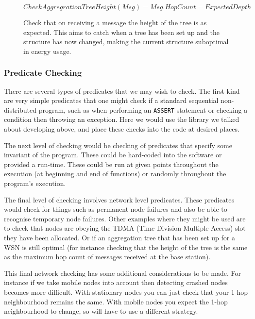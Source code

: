 \documentclass[a4paper]{article}
\begin{document}
\begin{figure}[H]
\begin{center}
    \begin{displaymath}
	CheckAggregrationTreeHeight(Msg) = Msg.HopCount = ExpectedDepth
	\end{displaymath}
	\caption{Check that on receiving a message the height of the tree is as
expected. This aims to catch when a tree has been set up and the structure has
now changed, making the current structure suboptimal in energy usage.}
\end{center}
\end{figure}

\subsubsection{Predicate Checking}

There are several types of predicates that we may wish to check. The first kind
are very simple predicates that one might check if a standard sequential
non-distributed program, such as when performing an \verb|ASSERT| statement or
checking a condition then throwing an exception. Here we would use the library
we talked about developing above, and place these checks into the code at
desired places.

The next level of checking would be checking of predicates that specify some
invariant of the program. These could be hard-coded into the software or
provided a run-time. These could be run at given points throughout the execution
(at beginning and end of functions) or randomly throughout the program's
execution.

The final level of checking involves network level predicates. These predicates
would check for things such as permanent node failures and also be able to
recognise temporary node failures. Other examples where they might be used are
to check that nodes are obeying the TDMA (Time Division Multiple Access) slot
they have been allocated. Or if an aggregation tree \cite{TankBible} that has
been set up for a WSN is still optimal (for instance checking that the height of
the tree is the same as the maximum hop count of messages received at the base
station).

This final network checking has some additional considerations to be made. For
instance if we take mobile nodes into account then detecting crashed nodes
becomes more difficult. With stationary nodes you can just check that your 1-hop
neighbourhood remains the same. With mobile nodes you expect the 1-hop
neighbourhood to change, so will have to use a different strategy.
\end{document}
